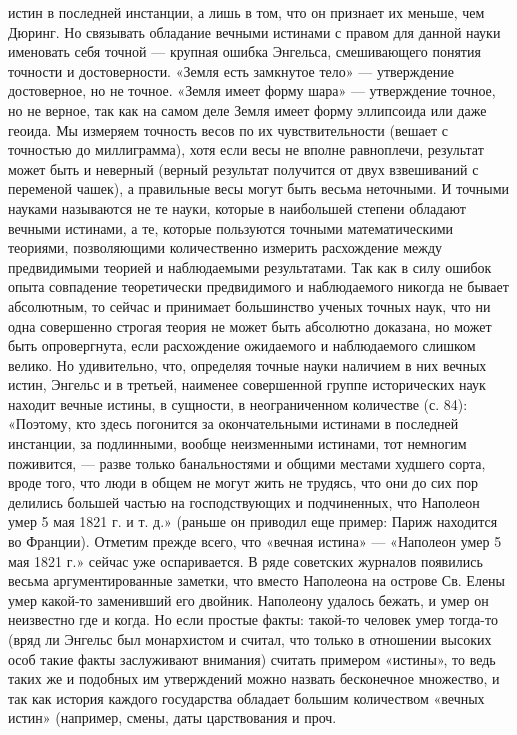 истин в последней инстанции, а лишь в том, что он признает их меньше, чем
Дюринг. Но связывать обладание вечными истинами с правом для данной науки
именовать себя точной --- крупная ошибка Энгельса, смешивающего понятия
точности и достоверности. «Земля есть замкнутое тело» --- утверждение
достоверное, но не точное. «Земля имеет форму шара» --- утверждение точное, но
не верное, так как на самом деле Земля имеет форму эллипсоида или даже геоида.
Мы измеряем точность весов по их чувствительности (вешает с точностью до
миллиграмма), хотя если весы не вполне равноплечи, результат может быть и
неверный (верный результат получится от двух взвешиваний с переменой чашек), а
правильные весы могут быть весьма неточными. И точными науками называются не те
науки, которые в наибольшей степени обладают вечными истинами, а те, которые
пользуются точными математическими теориями, позволяющими количественно
измерить расхождение между предвидимыми теорией и наблюдаемыми результатами.
Так как в силу ошибок опыта совпадение теоретически предвидимого и наблюдаемого
никогда не бывает абсолютным, то сейчас и принимает большинство ученых точных
наук, что ни одна совершенно строгая теория не может быть абсолютно доказана,
но может быть опровергнута, если расхождение ожидаемого и наблюдаемого слишком
велико. Но удивительно, что, определяя точные науки наличием в них вечных
истин, Энгельс и в третьей, наименее совершенной группе исторических наук
находит вечные истины, в сущности, в неограниченном количестве (с. 84):
«Поэтому, кто здесь погонится за окончательными истинами в последней инстанции,
за подлинными, вообще неизменными истинами, тот немногим поживится, --- разве
только банальностями и общими местами худшего сорта, вроде того, что люди в
общем не могут жить не трудясь, что они до сих пор делились большей частью на
господствующих и подчиненных, что Наполеон умер 5 мая 1821 г. и т. д.» (раньше
он приводил еще пример: Париж находится во Франции). Отметим прежде всего, что
«вечная истина» --- «Наполеон умер 5 мая 1821 г.» сейчас уже оспаривается. В
ряде советских журналов появились весьма аргументированные заметки, что вместо
Наполеона на острове Св. Елены умер какой-то заменивший его двойник. Наполеону
удалось бежать, и умер он неизвестно где и когда. Но если простые факты:
такой-то человек умер тогда-то (вряд ли Энгельс был монархистом и считал, что
только в отношении высоких особ такие факты заслуживают внимания) считать
примером «истины», то ведь таких же и подобных им утверждений можно назвать
бесконечное множество, и так как история каждого государства обладает большим
количеством «вечных истин» (например, смены, даты царствования и проч.
